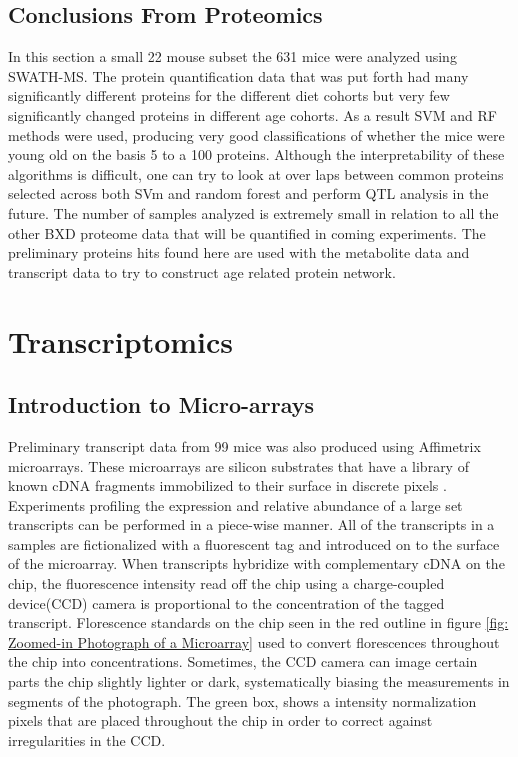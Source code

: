 \documentclass[a4paper]{book}
\begin{document}
	
	\section{Conclusions From Proteomics}
	
	In this section a small 22 mouse subset the 631 mice were analyzed using SWATH-MS. The protein quantification data that was put forth had many significantly different proteins for the different diet cohorts but very few significantly changed proteins in different age cohorts. As a result SVM and RF methods were used, producing very good classifications of whether the mice were young old on the basis 5 to a 100 proteins. Although the interpretability of these algorithms is difficult, one can try to look at over laps between common proteins selected across both SVm and random forest and perform QTL analysis in the future. The number of samples analyzed is extremely small in relation to all the other BXD proteome data that will be quantified in coming experiments. The preliminary proteins hits found here are used with the metabolite data and transcript data to try to construct age related protein network.
	
	\chapter{Transcriptomics}
	
	\section{Introduction to Micro-arrays}
	
	Preliminary transcript data from 99 mice was also produced using Affimetrix microarrays. These microarrays are silicon substrates that have a library of known cDNA fragments immobilized to their surface in discrete pixels \citep{Miller2009MicroArrays}.  Experiments profiling the expression and relative abundance of a large set transcripts can be performed in a piece-wise manner. All of the transcripts in a samples are fictionalized with a fluorescent tag and introduced on to the surface of the microarray. When transcripts hybridize with complementary cDNA on the chip, the fluorescence intensity read off the chip using a charge-coupled device(CCD) camera is proportional to the concentration of the tagged transcript. Florescence standards on the chip seen in the red outline in figure \ref{fig: Zoomed-in Photograph of a Microarray} used to convert florescences throughout the chip into concentrations. Sometimes, the CCD camera can image certain parts the chip slightly lighter or dark, systematically biasing the measurements in segments of the photograph. The green box, shows a intensity normalization pixels that are placed throughout the chip in order to correct against irregularities in the CCD.
	
\end{document}
